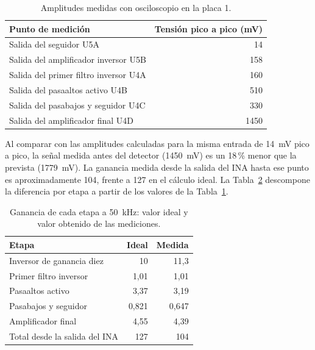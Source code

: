 \documentclass[12pt,a4paper]{article}
\begin{document}
\begin{table}[htbp]
    \centering
    \caption{Amplitudes medidas con osciloscopio en la placa 1.}
    \label{tab:amplitudes_medidas}
    \begin{tabular}{lr}
        \hline
        Punto de medición & Tensión pico a pico (mV) \\
        \hline
        Salida del seguidor U5A & 14 \\
        Salida del amplificador inversor U5B & 158 \\
        Salida del primer filtro inversor U4A & 160 \\
        Salida del pasaaltos activo U4B & 510 \\
        Salida del pasabajos y seguidor U4C & 330 \\
        Salida del amplificador final U4D & 1450 \\
        \hline
    \end{tabular}
\end{table}

Al comparar con las amplitudes calculadas para la misma entrada de 14~mV pico a pico, la señal medida
antes del detector (1450~mV) es un 18\,\% menor que la prevista (1779~mV). La ganancia medida desde la
salida del INA hasta ese punto es aproximadamente 104, frente a 127 en el cálculo ideal. La
Tabla~\ref{tab:ganancias_comparadas} descompone la diferencia por etapa a partir de los valores de la
Tabla~\ref{tab:amplitudes_medidas}.

\begin{table}[htbp]
    \centering
    \caption{Ganancia de cada etapa a 50~kHz: valor ideal y valor obtenido de las mediciones.}
    \label{tab:ganancias_comparadas}
    \begin{tabular}{lrr}
        \hline
        Etapa & Ideal & Medida \\
        \hline
        Inversor de ganancia diez & 10 & 11,3 \\
        Primer filtro inversor & 1,01 & 1,01 \\
        Pasaaltos activo & 3,37 & 3,19 \\
        Pasabajos y seguidor & 0,821 & 0,647 \\
        Amplificador final & 4,55 & 4,39 \\
        Total desde la salida del INA & 127 & 104 \\
        \hline
    \end{tabular}
\end{table}
\end{document}
